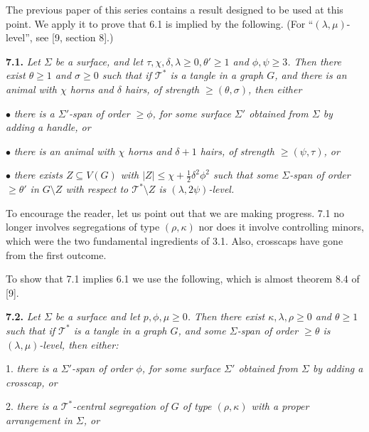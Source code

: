 
The previous paper of this series contains a result designed to be used at this point. We apply it to prove that 6.1 is implied by the following. (For ``$(\lambda, \mu)$-level'', see [9, section 8].)

\textbf{7.1.} \textit{Let $\Sigma$ be a surface, and let $\tau, \chi, \delta, \lambda \ge 0, \theta' \ge 1$ and $\phi, \psi \ge 3$. Then there exist $\theta \ge 1$ and $\sigma \ge 0$ such that if $\mathcal{T}^*$ is a tangle in a graph $G$, and there is an animal with $\chi$ horns and $\delta$ hairs, of strength $\ge (\theta, \sigma)$, then either}

\hspace*{12pt}$\bullet$ \textit{there is a $\Sigma'$-span of order $\ge \phi$, for some surface $\Sigma'$ obtained from $\Sigma$ by adding a handle, or}

\hspace*{12pt}$\bullet$ \textit{there is an animal with $\chi$ horns and $\delta + 1$ hairs, of strength $\ge (\psi, \tau)$, or}

\hspace*{12pt}$\bullet$ \textit{there exists $Z \subseteq V(G)$ with $|Z| \le \chi + \frac{1}{2}\delta^2\phi^2$ such that some $\Sigma$-span of order $\ge \theta'$ in $G\setminus Z$ with respect to $\mathcal{T}^*\setminus Z$ is $(\lambda, 2\psi)$-level.}

To encourage the reader, let us point out that we are making progress. 7.1 no longer involves segregations of type $(\rho, \kappa)$ nor does it involve controlling minors, which were the two fundamental ingredients of 3.1. Also, crosscaps have gone from the first outcome.

To show that 7.1 implies 6.1 we use the following, which is almost theorem 8.4 of [9].

\textbf{7.2.} \textit{Let $\Sigma$ be a surface and let $p, \phi, \mu \ge 0$. Then there exist $\kappa, \lambda, \rho \ge 0$ and $\theta \ge 1$ such that if $\mathcal{T}^*$ is a tangle in a graph $G$, and some $\Sigma$-span of order $\ge \theta$ is $(\lambda, \mu)$-level, then either:}

\hspace*{12pt}1. \textit{there is a $\Sigma'$-span of order $\phi$, for some surface $\Sigma'$ obtained from $\Sigma$ by adding a crosscap, or}

\hspace*{12pt}2. \textit{there is a $\mathcal{T}^*$-central segregation of $G$ of type $(\rho, \kappa)$ with a proper arrangement in $\Sigma$, or}


